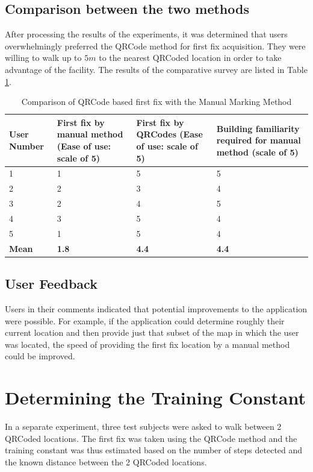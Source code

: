 \subsection{Comparison between the two methods}

After processing the results of the experiments, it was determined that 
users overwhelmingly preferred the QRCode method for first fix acquisition.
They were willing to walk up to $5 m$ to the nearest QRCoded location in 
order to take advantage of the facility. The results of the comparative 
survey are listed in Table \ref{tbl:QRCode_comparison_survey}.

\begin{table}
\centering
\begin{tabular}{p{0.8in} p{0.8in} p{0.8in} p{0.8in}}
\hline
\hline
User Number & First fix by manual method (Ease of use: scale of 5) & First fix by QRCodes (Ease of use: scale of 5) & Building familiarity required for manual method (scale of 5) \\
\hline 
1 & 1 & 5 & 5 \\
2 & 2 & 3 & 4 \\ 
3 & 2 & 4 & 5 \\
4 & 3 & 5 & 4 \\
5 & 1 & 5 & 4 \\
\hline
{\bf Mean} & {\bf 1.8} & {\bf 4.4} & {\bf 4.4} \\
\hline
\end{tabular}
\caption{Comparison of QRCode based first fix with the Manual Marking Method\label{tbl:QRCode_comparison_survey}}
\end{table}

\subsection{User Feedback}

Users in their comments indicated that potential improvements to the 
application were possible. For example, if the application could determine 
roughly their current location and then provide just that subset of the map
in which the user was located, the speed of providing the first fix location 
by a manual method could be improved.

\section{Determining the Training Constant}

In a separate experiment, three test subjects were asked to walk between 
2 QRCoded locations. The first fix was taken using the QRCode method and 
the training constant was thus estimated based on the number of steps 
detected and the known distance between the 2 QRCoded locations.

